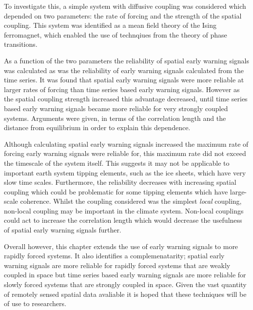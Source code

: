 To investigate this, a simple system with diffusive coupling was considered which depended on two parameters: the rate of forcing and the strength of the spatial coupling.
This system was identified as a mean field theory of the Ising ferromagnet, which enabled the use of technqiues from the theory of phase transitions.

As a function of the two parameters the reliability of spatial early warning signals was calculated as was the reliability of early warning signals calculated from the time series.
It was found that spatial early warning signals were more reliable at larger rates of forcing than time series based early warning signals. However as the spatial coupling
strength increased this advantage decreased, until time series based early warning signals became more reliable for very strongly coupled systems. Arguments were given, in terms of the correlation
length and the distance from equilibrium in order to explain this dependence.

Although calculating spatial early warning signals increased the maximum rate of forcing early warning signals were reliable for, this maximum rate did not exceed the timescale of the system
itself. This suggests it may not be applicable to important earth system tipping elements, such as the ice sheets, which have very slow time scales. Furthermore, the reliability decreases with
increasing spatial coupling which could be problematic for some tipping elements which have large-scale coherence. Whilst the coupling considered was the simplest \emph{local} coupling, non-local
coupling may be important in the climate system. Non-local couplings could act to increase the correlation length which would decrease the usefulness of spatial early warning signals further.

Overall however, this chapter extends the use of early warning signals to more rapidly forced systems. It also identifies a complemenatarity; spatial early warning signals are more reliable
for rapidly forced systems that are weakly coupled in space but time series based early warning signals are more reliable for slowly forced systems that are strongly coupled in space.
Given the vast quantity of remotely sensed spatial data avaliable \parencite{Campbell2011} it is hoped that these techniques will be of use to researchers.

\subsubsection{}

